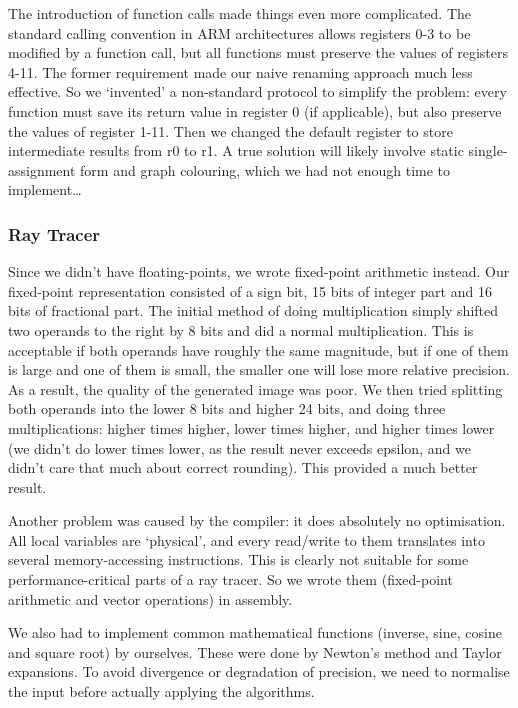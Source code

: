 \documentclass[11pt]{article}
\begin{document}
The introduction of function calls made things even more complicated. The standard calling convention in ARM architectures allows registers 0-3 to be modified by a function call, but all functions must preserve the values of registers 4-11. The former requirement made our naive renaming approach much less effective. So we ‘invented’ a non-standard protocol to simplify the problem: every function must save its return value in register 0 (if applicable), but also preserve the values of register 1-11. Then we changed the default register to store intermediate results from r0 to r1. A true solution will likely involve static single-assignment form and graph colouring, which we had not enough time to implement…

\subsubsection{Ray Tracer}

Since we didn’t have floating-points, we wrote fixed-point arithmetic instead. Our fixed-point representation consisted of a sign bit, 15 bits of integer part and 16 bits of fractional part. The initial method of doing multiplication simply shifted two operands to the right by 8 bits and did a normal multiplication. This is acceptable if both operands have roughly the same magnitude, but if one of them is large and one of them is small, the smaller one will lose more relative precision. As a result, the quality of the generated image was poor. We then tried splitting both operands into the lower 8 bits and higher 24 bits, and doing three multiplications: higher times higher, lower times higher, and higher times lower (we didn’t do lower times lower, as the result never exceeds epsilon, and we didn’t care that much about correct rounding). This provided a much better result.

Another problem was caused by the compiler: it does absolutely no optimisation. All local variables are ‘physical’, and every read/write to them translates into several memory-accessing instructions. This is clearly not suitable for some performance-critical parts of a ray tracer. So we wrote them (fixed-point arithmetic and vector operations) in assembly.

We also had to implement common mathematical functions (inverse, sine, cosine and square root) by ourselves. These were done by Newton’s method and Taylor expansions. To avoid divergence or degradation of precision, we need to normalise the input before actually applying the algorithms.
\end{document}
